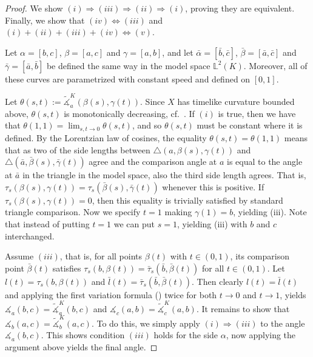 \documentclass[11pt,reqno]{amsart}
\theoremstyle{definition}
\newcommand{\Cref}[1]{\zcref[S]{#1}}
\theoremstyle{definition}
\theoremstyle{plain}
\theoremstyle{remark}
\newcommand{\ma}{\measuredangle}
\newcommand{\lm}[1]{\mathbb{L}^2(#1)}
\begin{document}
\begin{proof} 
We show $(i) \Rightarrow (iii) \Rightarrow (ii) \Rightarrow (i)$, 
proving they are equivalent. 
Finally, we show that $(iv)\Leftrightarrow (iii)$ and $(i) + (ii) + (iii) + (iv) \Leftrightarrow (v)$.

 Let $\alpha = [b,c]$, $\beta=[a,c]$ and $\gamma=[a,b]$, and let $\bar\alpha=[\bar b,\bar c]$, $\bar\beta=[\bar a,\bar c]$ and $\bar \gamma = [\bar a, \bar b]$ be defined the same way in the model space $\lm{K}$. Moreover, all of these curves are parametrized with constant speed and defined on $[0,1]$.

Let $\theta(s,t):=\widetilde{\ma}_a^K(\beta(s),\gamma(t))$. 
Since $X$ has timelike curvature bounded above, $\theta(s,t)$ is monotonically decreasing, cf.\ \cite[Definition 3.8]{beran-kunzinger-rott2024}. 
If $(i)$ is true, then we have that $\theta(1,1)=\lim_{s,t\to0}\theta(s,t)$, and so $\theta(s,t)$ must be constant where it is defined. 
By the Lorentzian law of cosines, the equality $\theta(s,t)=\theta
(1,1)$ means that as two of the side lengths between $\triangle(a,\beta(s),\gamma(t))$ and $\triangle(\bar a,\bar\beta(s),\bar\gamma(t))$ agree and the comparison angle at $a$ is equal to the angle at $\bar a$ in the triangle in the model space, also the third side length agrees. That is, $\tau_s(\beta(s),\gamma(t))=\tau_s(\bar\beta(s),\bar\gamma(t))$ whenever this is positive. If $\tau_s(\beta(s),\gamma(t))=0$, then this equality is trivially satisfied by standard triangle comparison. Now we specify $t=1$ making $\gamma(1)=b$, yielding (iii). 
Note that instead of putting $t=1$ we can put $s=1$, yielding (iii) with $b$ and $c$ interchanged. 


Assume $(iii)$, that is, for all points $\beta(t)$ with $t \in (0,1)$, its comparison point $\bar \beta(t)$ satisfies $\tau_s(b, \beta(t)) = \bar \tau_s(\bar b, \bar \beta(t))$ for all $t \in (0,1)$. Let $l(t) = \tau_s(b, \beta(t))$ and $\bar l(t) = \bar \tau_s(\bar b, \bar \beta(t))$. Then clearly $l(t) = \bar l(t)$ and applying the first variation formula (\Cref{fvf}) twice for both $t \to 0$ and $t \to 1$, yields $\ma_a (b,c) = \widetilde \ma_a^K (b,c)$ and $\ma_c (a,b) = \widetilde \ma_c^K (a,b)$. It remains to show that $\ma_b (a,c) = \widetilde \ma_b^K (a,c)$. To do this, we simply apply $(i) \Rightarrow (iii)$ to the angle $\ma_a (b,c)$. This shows condition $(iii)$ holds for the side $\alpha$, now applying the argument above yields the final angle.


\end{proof}
\end{document}
